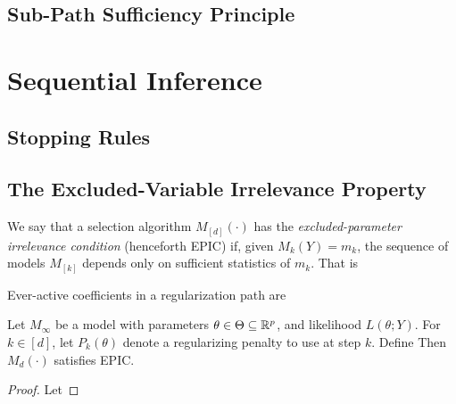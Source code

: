 \documentclass{article}
\begin{document}
\subsection{Sub-Path Sufficiency Principle}



\section{Sequential Inference}

\subsection{Stopping Rules}


\subsection{The Excluded-Variable Irrelevance Property}

We say that a selection algorithm $M_{[d]}(\cdot)$ has the {\em excluded-parameter irrelevance condition} (henceforth EPIC) if, given $M_k(Y)=m_k$, the sequence of models $M_{[k]}$ depends only on sufficient statistics of $m_k$. That is

Ever-active coefficients in a regularization path are 
\begin{proposition}
  Let $M_\infty$ be a model with parameters $\theta\in\Theta\subseteq \mathbb{R}^p$, and likelihood $L(\theta; Y)$. For $k\in [d]$, let $P_k(\theta)$ denote a regularizing penalty to use at step $k$. Define
  Then $M_d(\cdot)$ satisfies EPIC.
\end{proposition}

\begin{proof}
  Let 
\end{proof}

\begin{proposition}
  
\end{proposition}
\end{document}
